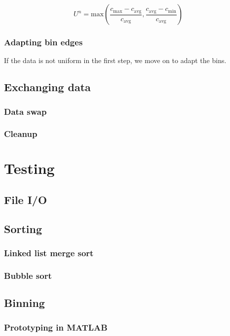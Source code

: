 \documentclass{article}
\begin{document}
\begin{equation}
	U^n = \textrm{max}( \dfrac{c_{\textrm{max}} - c_{\textrm{avg}}}{c_{\textrm{avg}}}, \dfrac{c_{\textrm{avg}} - c_{\textrm{min}}}{c_{\textrm{avg}}} )
\end{equation}


\subsubsection{Adapting bin edges}
If the data is not uniform in the first step, we move on to adapt the bins.






\subsection{Exchanging data}
\subsubsection{Data swap}
\subsubsection{Cleanup}


\section{Testing}


\subsection{File I/O}

\subsection{Sorting}
\subsubsection{Linked list merge sort}
\subsubsection{Bubble sort}

\subsection{Binning}
\subsubsection{Prototyping in MATLAB}
\end{document}

